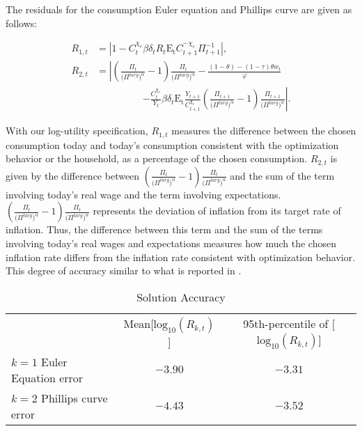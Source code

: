 \documentclass[11pt]{article}
\begin{document}
\begin{singlespace}
	The residuals for the consumption Euler equation and Phillips curve are given as follows:

	\begin{align}
	    R_{1,t} & = \left| 1 - C_{t}^{\chi_{c}}\beta\delta_{t}R_{t}\mathrm{E_{t}}C_{t+1}^{-\chi_{c}}\Pi_{t+1}^{-1} \right|, \\
	    R_{2,t} & = \left| \left(\frac{\Pi_{t}}{\bigl(\Pi^{targ}\bigr)^{\alpha}}-1\right)\frac{\Pi_{t}}{\bigl(\Pi^{targ}\bigr)^{\alpha}} - \frac{(1-\theta)- (1-\tau)\theta w_{t}}{\varphi}  \nonumber \right. \\
	    & \hspace{2cm} \left. - \frac{C_{t}^{\chi_{c}}}{Y_{t}}\beta\delta_{t}\mathrm{E_{t}}\frac{Y_{t+1}}{C_{t+1}^{\chi_{c}}} \left(\frac{\Pi_{t+1}}{\bigl(\Pi^{targ}\bigr)^{\alpha}}-1\right)\frac{\Pi_{t+1}}{\bigl(\Pi^{targ}\bigr)^{\alpha}} \right|.
	\end{align}

	With our log-utility specification, $R_{1,t}$ measures the difference between the chosen consumption today and today's consumption consistent with the optimization behavior or the household, as a percentage of the chosen consumption. $R_{2,t}$ is given by the difference between $\left(\frac{\Pi_{t}}{\bigl(\Pi^{targ}\bigr)^{\alpha}}-1\right)\frac{\Pi_{t}}{\bigl(\Pi^{targ}\bigr)^{\alpha}}$  and the sum of the term involving today's real wage and the term involving expectations. $\left(\frac{\Pi_{t}}{\bigl(\Pi^{targ}\bigr)^{\alpha}}-1\right)\frac{\Pi_{t}}{\bigl(\Pi^{targ}\bigr)^{\alpha}}$ represents the deviation of inflation from its target rate of inflation. Thus, the difference between this term and the sum of the terms involving today's real wages and expectations measures how much the chosen inflation rate differs from the inflation rate consistent with optimization behavior. This degree of accuracy similar to what is reported in \citet{AruobaCubaBordaSchorfheide2018}.

	\begin{table}
			\centering
			\caption{Solution Accuracy\label{T:Accuracy}}
{\footnotesize
			\begin{tabular}{lcc}
				\hline
				 & Mean[$\text{log}_10(R_{k,t})$] & 95th-percentile of [$\text{log}_10(R_{k,t})$]\\
				$k = 1$ Euler Equation error & $-3.90$ & $-3.31$  \\
				$k = 2$ Phillips curve error  & $-4.43$ & $-3.52$  \\
				\hline
			\end{tabular}
}		\end{table}

	\end{singlespace}
\end{document}
